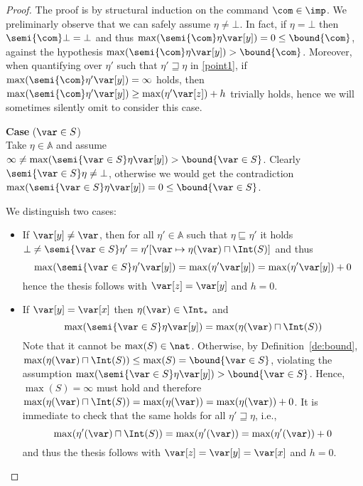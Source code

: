 \begin{proof}
  The proof is by structural induction on the command \(\com\in \imp\).
  We preliminarly observe that we can safely assume
  \(\eta \neq \bot\).
  In fact, if \(\eta = \bot\) then
  \(\semi{\com} \bot = \bot\) and thus
  \(\max(\semi{\com} \eta \var[y]) = 0 \leq \bound{\com}\), against the hypothesis \(\max(\semi{\com}\eta \var[y]) > \bound{\com}\). Moreover, when
  quantifying over \(\eta'\) such that \(\eta' \sqsupseteq \eta\) in \eqref{point1}, if \(\max(\semi{\com}\eta' \var[y]) = \infty\) holds, then \(\max(\semi{\com}\eta' \var[y]) \geq \max(\eta' \var[z]) + h\) trivially holds, hence we will sometimes silently omit to consider this case.



  \medskip
  
  
  \noindent
  \textbf{Case} (\(\var \in S\))\\
  Take \(\eta \in \mathbb{A}\) and assume
  \(\infty\neq\max(\semi{\var \in S}\eta \var[y]) > \bound{\var \in S}\).
  Clearly \(\semi{\var \in S}\eta \neq \bot\), otherwise we would get the contradiction
  \(\max(\semi{\var \in S}\eta \var[y]) =0 \leq \bound{\var \in S}\).
  
  We distinguish two cases:
  \begin{itemize}
    
  \item If \(\var[y] \neq \var\), then for all \(\eta' \in \mathbb{A}\)
    such that \(\eta \sqsubseteq \eta'\) it holds
    \(\bot \neq \semi{\var \in S}\eta' = \eta'[\var \mapsto \eta(\var)
      \sqcap \Int(S)]\) and thus
    \[
    \max(\semi{\var \in S}\eta' \var[y]) = \max(\eta' \var[y]) = \max(\eta' \var[y]) + 0
    \]
    hence the thesis follows with \(\var[z]=\var[y]\) and \(h = 0\).

  \item If \(\var[y] = \var[x]\) then  \(\eta(\var) \in \Int_*\) and
    \[ 
    \max(\semi{\var \in S}\eta \var[y]) = \max (\eta(\var) \sqcap
    \Int(S))
    \]
    Note that it cannot be \(\max(S)\in \nat\). Otherwise, by
    Definition~\ref{de:bound},
    \(\max (\eta(\var) \sqcap \Int(S)) \leq \max(S)= \bound{\var \in
      S}\), violating the assumption \(\max(\semi{\var \in S}\eta \var[y]) > \bound{\var \in S}\).
    Hence, \(\max(S) = \infty\) must hold and therefore
    \(\max (\eta(\var) \sqcap \Int(S)) = \max(\eta(\var))=
    \max(\eta(\var))+0\). It is immediate to check that the same holds
    for all
    \(\eta' \sqsupseteq \eta\), i.e.,
    \[
    \max (\eta'(\var) \sqcap \Int(S)) = \max(\eta'(\var))=
    \max(\eta'(\var))+0
    \]
    and thus the thesis follows with  \(\var[z]=\var[y]=\var[x]\) and \(h=0\).
  \end{itemize}  
  

\end{proof}
